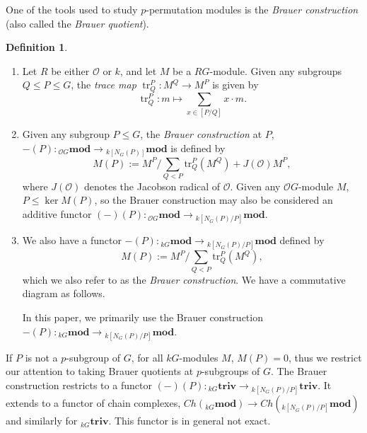 \documentclass[10pt,letterpaper, boxed, cm]{amsart}
\newcommand{\bigO}{\mathcal{O}}
\newcommand{\tr}{\operatorname{tr}}
\newcommand{\triv}{\mathbf{triv}}
\newcommand{\calO}{\mathcal{O}}
\theoremstyle{remark}
\theoremstyle{definition}
\newtheorem{definition}[theorem]{Definition}
\begin{document}
	One of the tools used to study $p$-permutation modules is the \textit{Brauer construction} (also called the \textit{Brauer quotient}).

	\begin{definition}
        \begin{enumerate}
            \item Let $R$ be either $\bigO$ or $k$, and let $M$ be a $RG$-module. Given any subgroups $Q \leq P \leq G$, the \textit{trace map} $\tr^P_Q: M^Q \to M^P$ is given by \[\tr^P_Q: m \mapsto \sum_{x \in [P/Q]} x\cdot m.\]

            \item Given any subgroup $P \leq G$, the \textit{Brauer construction} at $P$, $-(P): {}_{ \bigO G}\mathbf{mod} \to {}_{k[N_G(P)]}\mathbf{mod}$ is defined by \[M(P) := M^P/\sum_{Q < P} \text{tr}^P_Q(M^Q) + J(\bigO) M^P,\] where $J(\bigO)$ denotes the Jacobson radical of $\bigO$. Given any $\bigO G$-module $M$, $P \leq \ker M(P)$, so the Brauer construction may also be considered an additive functor $(-)(P): {}_{\bigO G}\mathbf{mod} \to {}_{k[N_G(P)/P]}\mathbf{mod}$.

            \item We also have a functor $-(P): {}_{kG}\mathbf{mod} \to {}_{k[N_G(P)/P]}\mathbf{mod}$ defined by \[M(P) := M^P/\sum_{Q < P} \text{tr}^P_Q(M^Q),\] which we also refer to as the \textit{Brauer construction}. We have a commutative diagram as follows.

            \begin{figure}[H]
                \centering
            \end{figure}

            In this paper, we primarily use the Brauer construction  $-(P): {}_{kG}\mathbf{mod} \to {}_{k[N_G(P)/P]}\mathbf{mod}$.
        \end{enumerate}

	\end{definition}


	If $P$ is not a $p$-subgroup of $G$, for all $kG$-modules $M$,  $M(P) = 0$, thus we restrict our attention to taking Brauer quotients at $p$-subgroups of $G$. The Brauer construction restricts to a functor $(-)(P): {}_{kG}\triv \to {}_{k[N_G(P)/P]}\triv$. It extends to a functor of chain complexes, $Ch({}_{kG}\mathbf{mod}) \to Ch({}_{k[N_G(P)/P]}\mathbf{mod})$ and similarly for ${}_{kG}\triv$. This functor is in general not exact.
\end{document}

